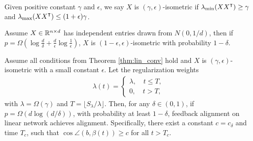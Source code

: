\begin{definition}
Given positive constant $\gamma$ and $\epsilon$, we say $X$ is $(\gamma, \epsilon)$-isometric if 
$\lambda_{\min}(XX\transpose)\geq\gamma$ and $\lambda_{\max}(XX\transpose)\leq(1+\epsilon)\gamma$.
\end{definition}

\begin{proposition}
Assume $X\in\mathbb{R}^{n\times d}$ has independent entries drawn from $N(0,1/d)$, then if $p=\Omega(\log\frac{d}{\delta}+\frac{d}{\epsilon}\log \frac{1}{\epsilon})$, $X$ is $(1-\epsilon, \epsilon)$-isometric with probability $1-\delta$.
\end{proposition}

\begin{theorem}
\label{thm:lin_align}
Assume all conditions from Theorem \ref{thm:lin_conv} hold and $X$ is $(\gamma, \epsilon)$-isometric with a small constant $\epsilon$. Let the regularization weights
\begin{align*}
\lambda(t) = 
\begin{cases}
    \lambda, \quad t\leq T,\\
    0, \quad t > T,
\end{cases}
\end{align*}
with $\lambda=\Omega(\gamma)$ and $T = \lfloor S_\lambda/\lambda\rfloor$. Then, for any $\delta\in(0,1)$, if $p = \Omega(d\log(d/\delta))$, with probability at least $1-\delta$, feedback alignment on linear network achieves alignment. Specifically, there exist a constant $c=c_\delta$ and time $T_c$, such that $\cos\angle(b, \beta(t))\geq c$ for all $t>T_c$.
\end{theorem}

